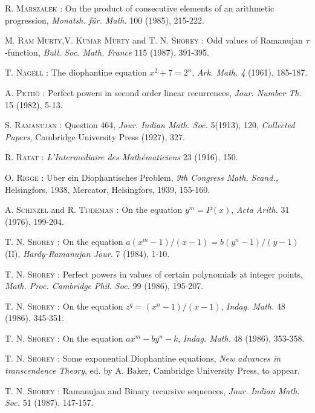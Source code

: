 \begin{thebibliography}{99}
 \textsc{R. Marszalek :} On the product of consecutive elements of an arithmetic progression, {\em Monatsh. f\"ur. Math.} 100 (1985), 215-222.

 \textsc{M. Ram Murty,\pageoriginale V. Kumar Murty} and \textsc{T. N. Shorey :} Odd values of Ramanujan $\tau$-function, {\em Bull. Soc. Math. France} 115 (1987), 391-395.

 \textsc{T. Nagell :} The diophantine equation $x^{2}+7=2^{n}$, {\em Ark. Math. 4} (1961), 185-187.

 \textsc{A. Peth\"o :} Perfect powers in second order linear recurrences, {\em Jour. Number Th.} 15 (1982), 5-13.

 \textsc{S. Ramanujan :} Question 464, {\em Jour. Indian Math. Soc.} 5(1913), 120, {\em Collected Papers,} Cambridge University Press (1927), 327.

 \textsc{R. Ratat :} {\em L'Intermediaire des Math\'ematiciens} 23 (1916), 150.

 \textsc{O. Rigge :} Uber ein Diophantisches Problem, {\em 9th Congress Math. Scand.,} Helsingfors, 1938, Mercator, Helsingfors, 1939, 155-160.

 \textsc{A. Schinzel} and \textsc{R. Tijdeman :}  On the equation $y^{m}=P(x)$, {\em Acta Arith.} 31 (1976), 199-204.

 \textsc{T. N. Shorey :} On the equation $a(x^{m}-1)/(x-1)=b(y^{n}-1)/(y-1)$ (II), {\em Hardy-Ramanujan Jour.} 7 (1984), 1-10.

 \textsc{T. N. Shorey :} Perfect powers in values of certain polynomials at integer points, {\em Math. Proc. Cambridge Phil. Soc.} 99 (1986), 195-207.

 \textsc{T. N. Shorey :} On the equation $z^{q}=(x^{n}-1)/(x-1)$, {\em Indag. Math.} 48 (1986), 345-351.

 \textsc{T. N. Shorey :} On the equation $ax^{m}-by^{n}-k$, {\em Indag. Math.} 48 (1986), 353-358.

 \textsc{T. N. Shorey :} Some exponential Diophantine equations, {\em New advances in transcendence Theory}, ed. by A. Baker, Cambridge University Press, to appear.

 \textsc{T. N. Shorey :} Ramanujan and Binary recursive sequences, {\em Jour. Indian Math. Soc.} 51 (1987), 147-157.


\end{thebibliography}
